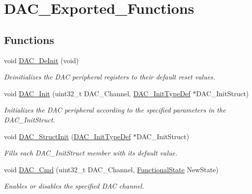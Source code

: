 \hypertarget{group___d_a_c___exported___functions}{}\section{D\+A\+C\+\_\+\+Exported\+\_\+\+Functions}
\label{group___d_a_c___exported___functions}
\subsection*{Functions}
\begin{DoxyCompactItemize}
\item 
void \mbox{\hyperlink{group___d_a_c___exported___functions_ga1fae225204e1e049d6795319e99ba8bc}{D\+A\+C\+\_\+\+De\+Init}} (void)
\begin{DoxyCompactList}\small\item\em Deinitializes the D\+AC peripheral registers to their default reset values. \end{DoxyCompactList}\item 
void \mbox{\hyperlink{group___d_a_c___exported___functions_ga7c59850468ed4bf0659663fe495441da}{D\+A\+C\+\_\+\+Init}} (uint32\+\_\+t D\+A\+C\+\_\+\+Channel, \mbox{\hyperlink{struct_d_a_c___init_type_def}{D\+A\+C\+\_\+\+Init\+Type\+Def}} $\ast$D\+A\+C\+\_\+\+Init\+Struct)
\begin{DoxyCompactList}\small\item\em Initializes the D\+AC peripheral according to the specified parameters in the D\+A\+C\+\_\+\+Init\+Struct. \end{DoxyCompactList}\item 
void \mbox{\hyperlink{group___d_a_c___exported___functions_gadfc270974d54cb5fa5f92556015c4046}{D\+A\+C\+\_\+\+Struct\+Init}} (\mbox{\hyperlink{struct_d_a_c___init_type_def}{D\+A\+C\+\_\+\+Init\+Type\+Def}} $\ast$D\+A\+C\+\_\+\+Init\+Struct)
\begin{DoxyCompactList}\small\item\em Fills each D\+A\+C\+\_\+\+Init\+Struct member with its default value. \end{DoxyCompactList}\item 
void \mbox{\hyperlink{group___d_a_c___exported___functions_ga323e61530d7fa9396c3bce9edb61f733}{D\+A\+C\+\_\+\+Cmd}} (uint32\+\_\+t D\+A\+C\+\_\+\+Channel, \mbox{\hyperlink{group___exported__types_gac9a7e9a35d2513ec15c3b537aaa4fba1}{Functional\+State}} New\+State)
\begin{DoxyCompactList}\small\item\em Enables or disables the specified D\+AC channel. \end{DoxyCompactList}\item 

\end{DoxyCompactItemize}
